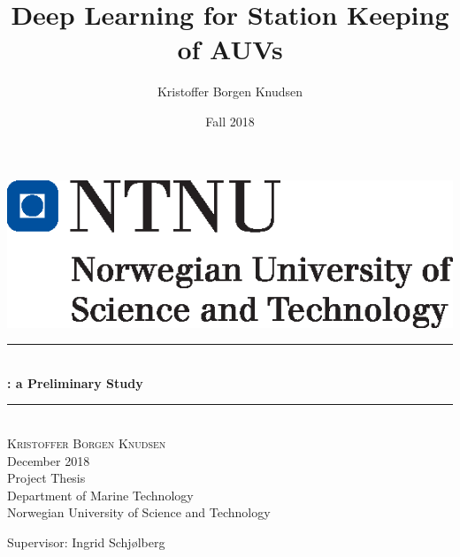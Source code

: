 \documentclass[12pt]{report}
\title{Deep Learning for Station Keeping of AUVs}		%
\author{Kristoffer Borgen Knudsen}								%
\date{Fall 2018}											%
\makeatletter
\let\thetitle\@title
\makeatother
\begin{document}

\begin{titlepage}
    \thispagestyle{empty}
    \includegraphics[left]{logo.eps}	%
    \mbox{}\\[6pc]
	\begin{center}
    \vspace*{0.5 cm}
    
    
    \rule{\linewidth}{0.5 mm} \\[0.4 cm]
	{ \huge \bfseries \thetitle : a Preliminary Study}\\
	\rule{\linewidth}{0.5 mm} \\[1.5 cm]
	
	
	\textsc{\Large Kristoffer Borgen Knudsen}\\[0.5 cm]
	\Large{December 2018}\\[1.5 cm]
	Project Thesis\\
	Department of Marine Technology \\
	Norwegian University of Science and Technology
	
	\end{center}
	
	\vfill
	\noindent Supervisor: Ingrid Schjølberg
	
	
    
    
    
    
	
\end{titlepage}


\newpage

\newpage

\tableofcontents
\pagebreak













\printglossary[type=\acronymtype,title=Acronyms]

\newpage


\newpage
\appendix

\end{document}
